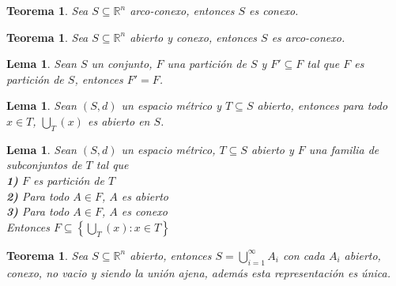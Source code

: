 \documentclass[oneside]{book} %
\theoremstyle{Teorema}
\newtheorem{Teorema}[Definicion]{Teorema}
\newtheorem{Lema}[Definicion]{Lema}
\theoremstyle{Ejemplos}
\theoremstyle{[Obs]}
\renewcommand{\{}{\left\lbrace} %
\renewcommand{\}}{\right\rbrace} %
\newcommand{\U}{\bigcup} %
\renewcommand{\sc}{\subseteq} %
\newcommand{\Rn}{\mathbb{R}^n} %
\begin{document}
			\begin{Teorema}
				
				Sea $S \sc \Rn$ arco-conexo, entonces $S$ es conexo. \\

			\end{Teorema}

			\begin{Teorema}
				
				Sea $S \sc \Rn$ abierto y conexo, entonces $S$ es arco-conexo. \\

			\end{Teorema}

			\begin{Lema}
				
				Sean $S$ un conjunto, $F$ una partición de $S$ y $F' \sc F$ tal que $F$ es partición de $S$, entonces $F' = F$. \\

			\end{Lema}

			\begin{Lema}
				
				Sean $(S, d)$ un espacio métrico y $T \sc S$ abierto, entonces para todo $x \in T$, $\U_{T}(x)$ es abierto en $S$. \\

			\end{Lema}

			\begin{Lema}
				
				Sean $(S, d)$ un espacio métrico, $T \sc S$ abierto y $F$ una familia de subconjuntos de $T$ tal que \\

				\textbf{1)} $F$ es partición de $T$ \\

				\textbf{2)} Para todo $A \in F$, $A$ es abierto \\

				\textbf{3)} Para todo $A \in F$, $A$ es conexo \\

				Entonces $F \sc \{ \U_{T}(x) : x \in T \}$ \\

			\end{Lema}

			\begin{Teorema}
				
				Sea $S \sc \Rn$ abierto, entonces $S = \displaystyle\U_{i = 1}^{\infty} A_i$ con cada $A_i$ abierto, conexo, no vacio y siendo la unión ajena, además esta representación es única. \\

			\end{Teorema}
\end{document}
